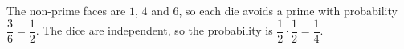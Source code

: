 The non-prime faces are $1$, $4$ and $6$, so each die avoids a prime with probability $\dfrac{3}{6}=\dfrac{1}{2}$. The dice are independent, so the probability is $\dfrac{1}{2}\cdot\dfrac{1}{2}=\boxed{\dfrac{1}{4}}$.
